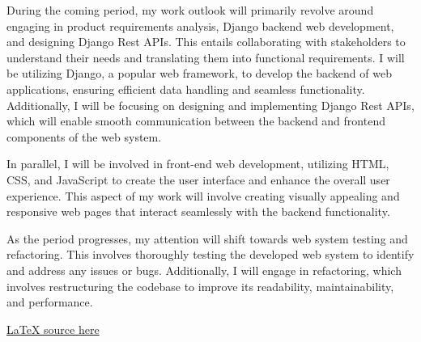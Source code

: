 \documentclass{article}
\begin{document}
During the coming period, my work outlook will primarily revolve around engaging in product requirements analysis, Django backend web development, and designing Django Rest APIs. This entails collaborating with stakeholders to understand their needs and translating them into functional requirements. I will be utilizing Django, a popular web framework, to develop the backend of web applications, ensuring efficient data handling and seamless functionality. Additionally, I will be focusing on designing and implementing Django Rest APIs, which will enable smooth communication between the backend and frontend components of the web system.
\newline

In parallel, I will be involved in front-end web development, utilizing HTML, CSS, and JavaScript to create the user interface and enhance the overall user experience. This aspect of my work will involve creating visually appealing and responsive web pages that interact seamlessly with the backend functionality.
\newline

As the period progresses, my attention will shift towards web system testing and refactoring. This involves thoroughly testing the developed web system to identify and address any issues or bugs. Additionally, I will engage in refactoring, which involves restructuring the codebase to improve its readability, maintainability, and performance.


\href{https://github.com/ammar-faifi/latex}{LaTeX source here}
\end{document}
